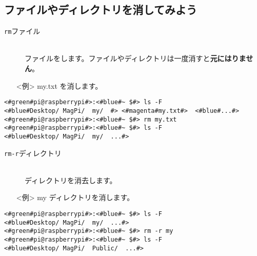 \subsection{ファイルやディレクトリを消してみよう}
\begin{description}
\item[\texttt{rm}\textvisiblespace ファイル]\mbox{}\\
ファイルをします。ファイルやディレクトリは一度消すと\textbf{元にはりません}。
\end{description}
\begin{itemize}
\item[<例>]my.txt を消します。
\end{itemize}
\begin{lstlisting}[caption=cpの例, label=cp]
<#green#pi@raspberrypi#>:<#blue#~ $#> ls -F
<#blue#Desktop/	MagPi/	my/	 #>	<#magenta#my.txt#>	<#blue#...#>
<#green#pi@raspberrypi#>:<#blue#~ $#> rm my.txt
<#green#pi@raspberrypi#>:<#blue#~ $#> ls -F
<#blue#Desktop/	MagPi/	my/	 ...#>
\end{lstlisting}
\begin{description}
\item[\texttt{rm}\textvisiblespace \texttt{-r}\textvisiblespace ディレクトリ]\mbox{}\\
ディレクトリを消去します。
\end{description}
\begin{itemize}
\item[<例>]my ディレクトリを消します。
\end{itemize}
\begin{lstlisting}[caption=cp -rの例, label=cp-R]
<#green#pi@raspberrypi#>:<#blue#~ $#> ls -F
<#blue#Desktop/	MagPi/	my/	 ...#>
<#green#pi@raspberrypi#>:<#blue#~ $#> rm -r my
<#green#pi@raspberrypi#>:<#blue#~ $#> ls -F
<#blue#Desktop/	MagPi/	Public/	 ...#>
\end{lstlisting}


\begin{tcolorbox}[title=\useOmetoi]
\begin{enumerate}
    \end{enumerate}
\end{tcolorbox}

    
    
        